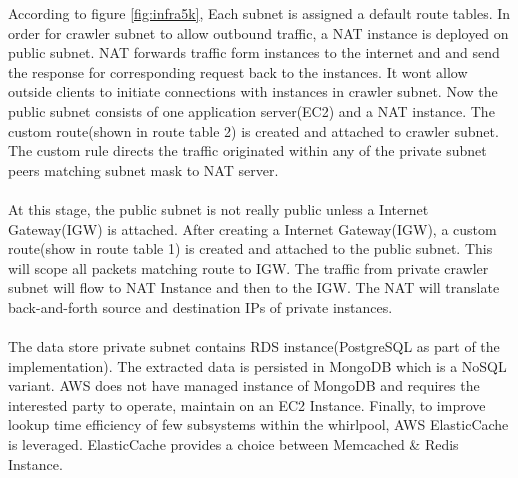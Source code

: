 \noindent
According to figure \ref{fig:infra5k}, Each subnet is assigned a default route tables. In order for crawler
subnet to allow outbound traffic, a NAT instance is deployed on public subnet. NAT forwards traffic form instances to the internet and and send the response for corresponding request back to the instances.
It wont allow outside clients to initiate connections with instances in crawler subnet. Now the public subnet consists of one application server(EC2) and a NAT instance. The custom route(shown in route table 2)  is created and attached to crawler subnet. The custom rule directs the traffic originated within any of the private subnet peers matching subnet mask  to NAT server.
\\
\\
At this stage, the public subnet is not really public unless a Internet Gateway(IGW) is attached. After creating a Internet Gateway(IGW), a custom route(show in route table 1) is created and attached to the public subnet. This will scope all packets matching  route to IGW. The traffic from private
crawler subnet will flow to NAT Instance and then to the IGW. The NAT will translate back-and-forth source
and destination IPs of private instances.
\\
\\
The data store private subnet contains RDS instance(PostgreSQL as part of the implementation). The
extracted data is persisted in MongoDB which is a NoSQL variant. AWS does not have managed instance of
MongoDB and requires the interested party to operate, maintain on an EC2 Instance. Finally, to improve
lookup time efficiency of few subsystems within the whirlpool, AWS ElasticCache is leveraged. ElasticCache
provides a choice between Memcached \& Redis Instance.

